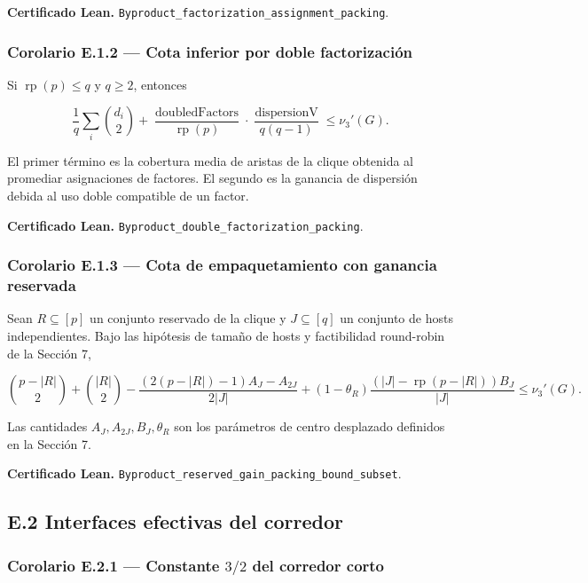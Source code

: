 \documentclass[
  spanish,
  11pt,
  a4paper,
]{article}
\begin{document}
\textbf{Certificado Lean.} \texttt{Byproduct\_factorization\_assignment\_packing}.

\subsubsection{Corolario E.1.2 --- Cota inferior por doble factorización}\label{corolario-e.1.2-cota-inferior-por-doble-factorizaciuxf3n}

Si \(\operatorname{rp}(p)\le q\) y \(q\ge2\), entonces

\[\frac1q\sum_i \binom{d_i}{2}+\frac{\operatorname{doubledFactors}}{\operatorname{rp}(p)}\cdot\frac{\operatorname{dispersionV}}{q(q-1)}\le \nu_3'(G).\]

El primer término es la cobertura media de aristas de la clique obtenida al promediar asignaciones de factores. El segundo es la ganancia de dispersión debida al uso doble compatible de un factor.

\textbf{Certificado Lean.} \texttt{Byproduct\_double\_factorization\_packing}.

\subsubsection{Corolario E.1.3 --- Cota de empaquetamiento con ganancia reservada}\label{corolario-e.1.3-cota-de-empaquetamiento-con-ganancia-reservada}

Sean \(R\subseteq[p]\) un conjunto reservado de la clique y \(J\subseteq[q]\) un conjunto de hosts independientes. Bajo las hipótesis de tamaño de hosts y factibilidad round-robin de la Sección 7,

\[\binom{p-|R|}{2}+\binom{|R|}{2}-\frac{(2(p-|R|)-1)A_J-A_{2J}}{2|J|}+(1-\theta_R)\frac{(|J|-\operatorname{rp}(p-|R|))B_J}{|J|}\le \nu_3'(G).\]

Las cantidades \(A_J,A_{2J},B_J,\theta_R\) son los parámetros de centro desplazado definidos en la Sección 7.

\textbf{Certificado Lean.} \texttt{Byproduct\_reserved\_gain\_packing\_bound\_subset}.

\subsection{E.2 Interfaces efectivas del corredor}\label{e.2-interfaces-efectivas-del-corredor}

\subsubsection{\texorpdfstring{Corolario E.2.1 --- Constante \(3/2\) del corredor corto}{Corolario E.2.1 --- Constante 3/2 del corredor corto}}\label{corolario-e.2.1-constante-32-del-corredor-corto}
\end{document}

